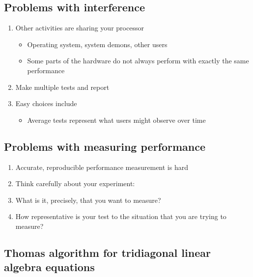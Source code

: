 \documentclass[%
oneside,                 %
final,                   %
10pt]{article}
\begin{document}
\subsection{Problems with interference}
\begin{enumerate}
\item Other activities are sharing your processor
\begin{itemize}

  \item Operating system, system demons, other users

  \item Some parts of the hardware do not always perform with exactly the same performance

\end{itemize}

\noindent
\item Make multiple tests and report

\item Easy choices include
\begin{itemize}

  \item Average tests represent what users might observe over time
\end{itemize}

\noindent
\end{enumerate}

\noindent
\subsection{Problems with measuring performance}
\begin{enumerate}
\item Accurate, reproducible performance measurement is hard

\item Think carefully about your experiment:

\item What is it, precisely, that you want to measure?

\item How representative is your test to the situation that you are trying to measure?
\end{enumerate}

\noindent
\subsection{Thomas algorithm for tridiagonal linear algebra equations}
\end{document}
